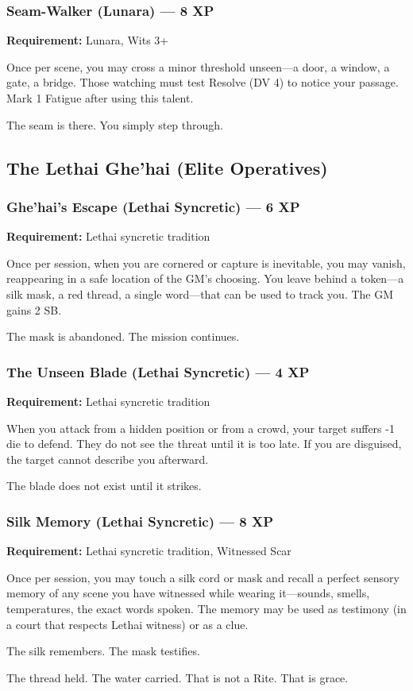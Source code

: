 \subsubsection{Seam-Walker (Lunara) — 8 XP}

\textbf{Requirement:} Lunara, Wits 3+

Once per scene, you may cross a minor threshold unseen—a door, a window, a gate, a bridge. Those watching must test Resolve (DV 4) to notice your passage. Mark 1 Fatigue after using this talent.

The seam is there. You simply step through.

\subsection{The Lethai Ghe'hai (Elite Operatives)}

\subsubsection{Ghe'hai's Escape (Lethai Syncretic) — 6 XP}

\textbf{Requirement:} Lethai syncretic tradition

Once per session, when you are cornered or capture is inevitable, you may vanish, reappearing in a safe location of the GM's choosing. You leave behind a token—a silk mask, a red thread, a single word—that can be used to track you. The GM gains 2 SB.

The mask is abandoned. The mission continues.

\subsubsection{The Unseen Blade (Lethai Syncretic) — 4 XP}

\textbf{Requirement:} Lethai syncretic tradition

When you attack from a hidden position or from a crowd, your target suffers -1 die to defend. They do not see the threat until it is too late. If you are disguised, the target cannot describe you afterward.

The blade does not exist until it strikes.

\subsubsection{Silk Memory (Lethai Syncretic) — 8 XP}

\textbf{Requirement:} Lethai syncretic tradition, Witnessed Scar

Once per session, you may touch a silk cord or mask and recall a perfect sensory memory of any scene you have witnessed while wearing it—sounds, smells, temperatures, the exact words spoken. The memory may be used as testimony (in a court that respects Lethai witness) or as a clue.

The silk remembers. The mask testifies.

The thread held. The water carried. That is not a Rite. That is grace.
